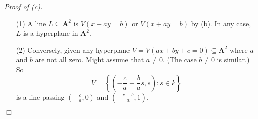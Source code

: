 \documentclass{article}
\begin{document}
\emph{Proof of (c).}
\begin{enumerate}
\item[(1)]
  A line $L \subseteq \mathbf{A}^{2}$ is $V(x+ay=b)$ or $V(x+ay=b)$ by (b).
  In any case, $L$ is a hyperplane in $\mathbf{A}^{2}$.

\item[(2)]
  Conversely, given any hyperplane $V = V(ax + by + c = 0) \subseteq \mathbf{A}^{2}$
  where $a$ and $b$ are not all zero.
  Might assume that $a \neq 0$. (The case $b \neq 0$ is similar.)
  So
  \[
    V = \left\{ \left(-\frac{c}{a}-\frac{b}{a}s, s\right) : s \in k \right\}
  \]
  is a line passing $\left(-\frac{c}{a}, 0\right)$ and $\left(-\frac{c+b}{a}, 1\right)$.
\end{enumerate}
$\Box$ \\
\end{document}
